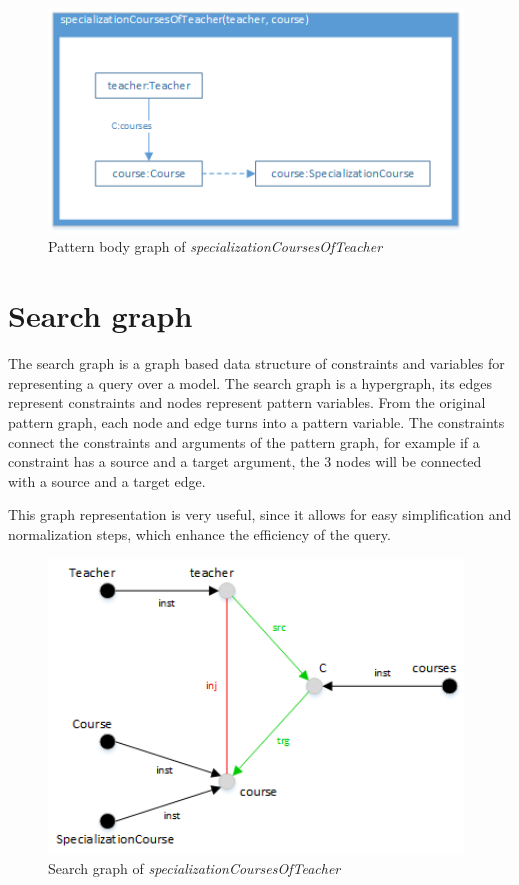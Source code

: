 \begin{figure}[!ht]
\centering
\includegraphics[width=110mm,
keepaspectratio]{figures/pattern_body_graph.png}
\caption{Pattern body graph of \emph{specializationCoursesOfTeacher}}
\label{fig:patternBodyGraph}
\end{figure}

\section{Search graph}\label{sec:SearchGraph}

The search graph is a graph based data structure of constraints and variables
for representing a query over a model. The search graph is a hypergraph, its
edges represent constraints and nodes represent pattern variables. From the
original pattern graph, each node and edge turns into a pattern variable. The
constraints connect the constraints and arguments of the pattern graph, for
example if a constraint has a source and a target argument, the 3 nodes will be
connected with a source and a target edge.

This graph representation is very useful, since it allows for easy
simplification and normalization steps, which enhance the efficiency of the
query.

\begin{figure}[!ht]
\centering
\includegraphics[width=110mm,
keepaspectratio]{figures/search_graph.png}
\caption{Search graph of \emph{specializationCoursesOfTeacher}}
\label{fig:searchGraph}
\end{figure}


